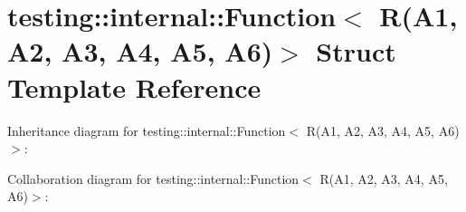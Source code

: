 \hypertarget{structtesting_1_1internal_1_1Function_3_01R_07A1_00_01A2_00_01A3_00_01A4_00_01A5_00_01A6_08_4}{}\section{testing\+:\+:internal\+:\+:Function$<$ R(A1, A2, A3, A4, A5, A6)$>$ Struct Template Reference}
\label{structtesting_1_1internal_1_1Function_3_01R_07A1_00_01A2_00_01A3_00_01A4_00_01A5_00_01A6_08_4}


Inheritance diagram for testing\+:\+:internal\+:\+:Function$<$ R(A1, A2, A3, A4, A5, A6)$>$\+:


Collaboration diagram for testing\+:\+:internal\+:\+:Function$<$ R(A1, A2, A3, A4, A5, A6)$>$\+:
